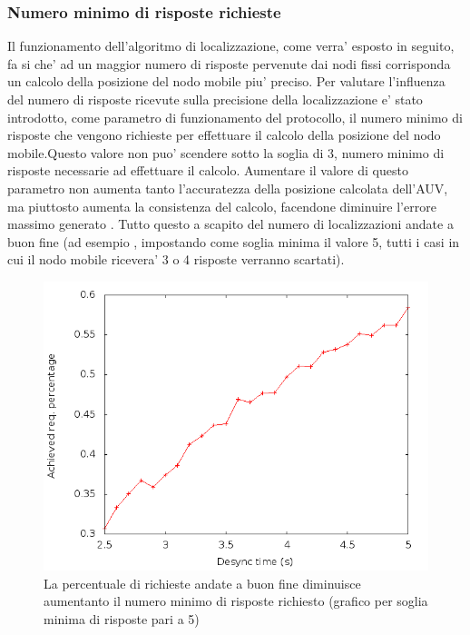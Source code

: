\documentclass[Lau,binding=0.6cm]{sapthesis}
\begin{document}
\subsubsection{Numero minimo di risposte richieste}
Il funzionamento dell'algoritmo di localizzazione, come verra' esposto in seguito, fa si che' ad un maggior numero di risposte pervenute dai nodi fissi corrisponda un calcolo della posizione del nodo mobile piu' preciso.
Per valutare l'influenza del numero di risposte ricevute sulla precisione della localizzazione e' stato introdotto, come parametro di funzionamento del protocollo, il numero minimo di risposte che vengono richieste per effettuare il calcolo della posizione del nodo mobile.\newline Questo valore non puo' scendere sotto la soglia di 3, numero minimo di risposte necessarie ad effettuare il calcolo. 
Aumentare il valore di questo parametro non aumenta tanto l'accuratezza della posizione calcolata dell'AUV, ma piuttosto aumenta la consistenza del calcolo, facendone diminuire l'errore massimo generato . Tutto questo a scapito  del numero di localizzazioni andate a buon fine (ad esempio , impostando come soglia minima il valore 5, tutti i casi in cui il nodo mobile ricevera' 3 o 4  risposte verranno scartati).\newline
\begin{figure}[H]
    \centering
    \includegraphics[scale=0.5]{achievedlochexagon6nodescutoff4req5preempt0droponepoint0speed1.png}
    \caption{La percentuale di richieste andate a buon fine diminuisce aumentanto il numero minimo di risposte richiesto (grafico per soglia minima di risposte pari a 5)}
\end{figure}
\end{document}
